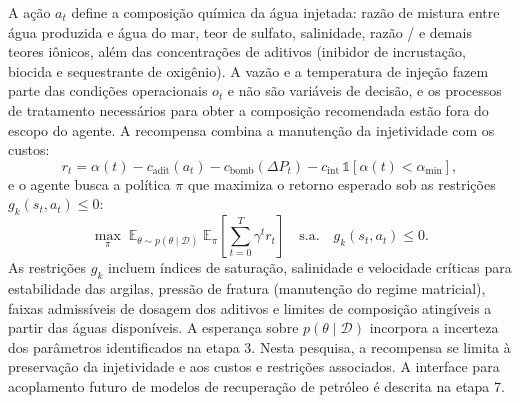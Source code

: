 \documentclass[10pt,a4paper]{article}
\begin{document}
A ação $a_t$ define a composição química da água injetada: razão de mistura entre água
produzida e água do mar, teor de sulfato, salinidade, razão / e demais
teores iônicos, além das concentrações de aditivos (inibidor de incrustação, biocida e
sequestrante de oxigênio). A vazão e a temperatura de injeção fazem parte das condições
operacionais $o_t$ e não são variáveis de decisão, e os processos de tratamento necessários
para obter a composição recomendada estão fora do escopo do agente. A recompensa combina a
manutenção da injetividade com os custos:
\begin{equation}
r_t = \alpha(t) - c_{\mathrm{adit}}(a_t) - c_{\mathrm{bomb}}(\Delta P_t) - c_{\mathrm{int}}\,\mathbb{1}[\alpha(t) < \alpha_{\min}],
\end{equation}
e o agente busca a política $\pi$ que maximiza o retorno esperado sob as restrições
$g_k(s_t,a_t)\le 0$:
\begin{equation}
\max_{\pi}\; \mathbb{E}_{\theta \sim p(\theta\mid\mathcal{D})}\;\mathbb{E}_{\pi}\!\left[\sum_{t=0}^{T} \gamma^{t} r_t\right]
\quad \text{s.a.} \quad g_k(s_t,a_t)\le 0 .
\end{equation}
As restrições $g_k$ incluem índices de saturação, salinidade e velocidade críticas para
estabilidade das argilas, pressão de fratura (manutenção do regime matricial), faixas
admissíveis de dosagem dos aditivos e limites de composição atingíveis a partir das águas
disponíveis. A esperança sobre
$p(\theta\mid\mathcal{D})$ incorpora a incerteza dos parâmetros identificados na etapa 3.
Nesta pesquisa, a recompensa se limita à preservação da injetividade e aos custos e restrições associados. A interface para acoplamento futuro de modelos de recuperação de petróleo é descrita na etapa 7.
\end{document}
